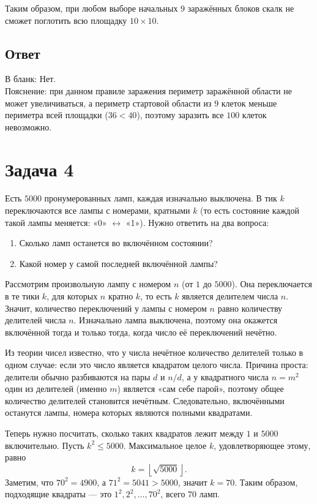 \documentclass[12pt,a4paper]{article}
\begin{document}
Таким образом, при любом выборе начальных $9$ заражённых блоков скалк не сможет поглотить всю площадку $10\times 10$.

\subsection*{Ответ}
В бланк: Нет.\\
Пояснение: при данном правиле заражения периметр заражённой области не может увеличиваться, а периметр стартовой области из $9$ клеток меньше периметра всей площадки ($36 < 40$), поэтому заразить все $100$ клеток невозможно.
\newpage

\section*{Задача 4}

Есть $5000$ пронумерованных ламп, каждая изначально выключена. В тик $k$ переключаются все лампы с номерами, кратными $k$ (то есть состояние каждой такой лампы меняется: «0» $\leftrightarrow$ «1»). Нужно ответить на два вопроса:
\begin{enumerate}
  \item Сколько ламп останется во включённом состоянии?
  \item Какой номер у самой последней включённой лампы?
\end{enumerate}

Рассмотрим произвольную лампу с номером $n$ (от $1$ до $5000$). Она переключается в те тики $k$, для которых $n$ кратно $k$, то есть $k$ является делителем числа $n$. Значит, количество переключений у лампы с номером $n$ равно количеству делителей числа $n$. Изначально лампа выключена, поэтому она окажется включённой тогда и только тогда, когда число её переключений нечётно.

Из теории чисел известно, что у числа нечётное количество делителей только в одном случае: если это число является квадратом целого числа. Причина проста: делители обычно разбиваются на пары $d$ и $n/d$, а у квадратного числа $n = m^2$ один из делителей (именно $m$) является «сам себе парой», поэтому общее количество делителей становится нечётным. Следовательно, включёнными останутся лампы, номера которых являются полными квадратами.

Теперь нужно посчитать, сколько таких квадратов лежит между $1$ и $5000$ включительно. Пусть $k^2 \leq 5000$. Максимальное целое $k$, удовлетворяющее этому, равно
\[
k = \left\lfloor \sqrt{5000} \right\rfloor.
\]
Заметим, что $70^2 = 4900$, а $71^2 = 5041 > 5000$, значит $k = 70$. Таким образом, подходящие квадраты --- это $1^2, 2^2, \dots, 70^2$, всего $70$ ламп.
\end{document}
